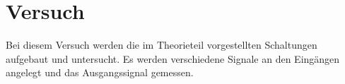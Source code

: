 \section{Versuch}

Bei diesem Versuch werden die im Theorieteil vorgestellten Schaltungen aufgebaut und untersucht.
Es werden verschiedene Signale an den Eingängen angelegt und das Ausgangssignal gemessen.